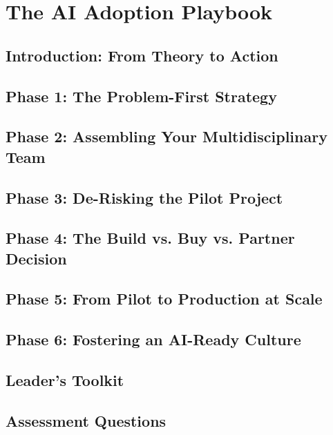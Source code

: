\chapter{The AI Adoption Playbook}
\label{chap:the_ai_adoption_playbook}

\section{Introduction: From Theory to Action}
\label{sec:playbook_introduction}

\section{Phase 1: The Problem-First Strategy}
\label{sec:phase1_problem_first}

\section{Phase 2: Assembling Your Multidisciplinary Team}
\label{sec:phase2_assembling_team}

\section{Phase 3: De-Risking the Pilot Project}
\label{sec:phase3_derisking_pilot}

\section{Phase 4: The Build vs. Buy vs. Partner Decision}
\label{sec:phase4_build_vs_buy}

\section{Phase 5: From Pilot to Production at Scale}
\label{sec:phase5_pilot_to_production}

\section{Phase 6: Fostering an AI-Ready Culture}
\label{sec:phase6_fostering_culture}

\section{Leader's Toolkit}
\label{sec:playbook_leaders_toolkit}

\section{Assessment Questions}
\label{sec:playbook_assessment_questions}
